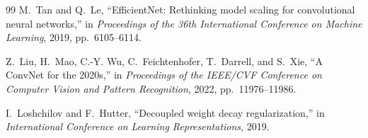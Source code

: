 \begin{thebibliography}{99}
M.~Tan and Q.~Le,
``EfficientNet: Rethinking model scaling for convolutional neural networks,''
in \emph{Proceedings of the 36th International Conference on Machine Learning}, 2019, pp.~6105--6114.

Z.~Liu, H.~Mao, C.-Y. Wu, C.~Feichtenhofer, T.~Darrell, and S.~Xie,
``A ConvNet for the 2020s,''
in \emph{Proceedings of the IEEE/CVF Conference on Computer Vision and Pattern Recognition}, 2022, pp.~11976--11986.

I.~Loshchilov and F.~Hutter,
``Decoupled weight decay regularization,''
in \emph{International Conference on Learning Representations}, 2019.

\end{thebibliography}
